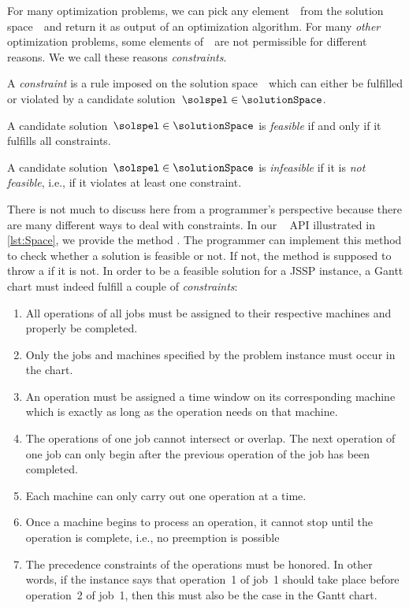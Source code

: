 %
%
\label{sec:solutionSpace:feasibility}%
%
For many optimization problems, we can pick any element~\solspel\ from the solution space~\solutionSpace\ and return it as output of an optimization algorithm.
For many \emph{other} optimization problems, some elements of~\solutionSpace\ are not permissible for different reasons.
We we call these reasons \emph{constraints}.%
%
%
%
\begin{definition}[Constraint]%
\label{def:constraint}%
A \emph{constraint} is a rule imposed on the solution space~\solutionSpace\ which can either be fulfilled or violated by a candidate solution~$\solspel\in\solutionSpace$.%
\end{definition}%
%
\begin{definition}[Feasibility]%
\label{def:feasibility}%
A candidate solution~$\solspel\in\solutionSpace$ is \emph{feasible} if and only if it fulfills all constraints.%
\end{definition}%
%
\begin{definition}[Infeasibility]%
\label{def:infeasibility}%
A candidate solution~$\solspel\in\solutionSpace$ is \emph{infeasible} if it is \emph{not feasible}, i.e., if it violates at least one constraint.%
\end{definition}%
%
\endhsection%
%
%
%
There is not much to discuss here from a programmer's perspective because there are many different ways to deal with constraints.
In our \moptipy\  API illustrated in \cref{lst:Space}, we provide the method .
The programmer can implement this method to check whether a solution is feasible or not.
If not, the method is supposed to throw a  if it is not.%
%
\endhsection%
%
%
%
In order to be a feasible solution for a \gls{JSSP} instance, a Gantt chart must indeed fulfill a couple of \emph{constraints}:%
%
\begin{enumerate}
%
\item All operations of all jobs must be assigned to their respective machines and properly be completed.%
%
\item Only the jobs and machines specified by the problem instance must occur in the chart.%
%
\item An operation must be assigned a time window on its corresponding machine which is exactly as long as the operation needs on that machine.%
%
\item The operations of one job cannot intersect or overlap. %
The next operation of one job can only begin after the previous operation of the job has been completed.%
%
\item Each machine can only carry out one operation at a time.%
%
\item Once a machine begins to process an operation, it cannot stop until the operation is complete, i.e., no preemption is possible%
%
\item The precedence constraints of the operations must be honored. %
In other words, if the instance says that operation~1 of job~1 should take place before operation~2 of job~1, then this must also be the case in the Gantt chart.%
%
\end{enumerate}%
